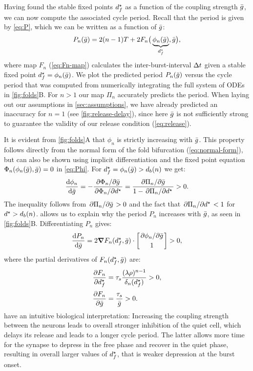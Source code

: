 \documentclass[../manuscript.tex]{subfiles}
\begin{document}
Having found the stable fixed points $d^\star_f$ as a function of the coupling strength $\bar g$, we can now compute the associated cycle period.
Recall that the period is given by \cref{eq:P}, which we can be written as a function of $\bar g$:
\begin{equation}
  \label{eq:period}
  P_n(\bar g) = 2(n-1)T + 2F_n\big(\underbrace{\phi_n(\bar g)}_{d^\star_f}, \bar g\big),
\end{equation}
where map $F_n$ (\cref{eq:Fn-map}) calculates the inter-burst-interval $\Delta t$ given a stable fixed point $d^\star_f=\phi_n(\bar g)$.
We plot the predicted period $P_n(\bar g)$ versus the cycle period that was computed from numerically integrating the full system of ODEs in \cref{fig:folds}B.
For $n>1$ our map $\Pi_n$ accurately predicts the period.
When laying out our assumptions in \cref{sec:assumptions}, we have already predicted an inaccuracy for $n=1$ (see \cref{fig:release-delay}), since here $\bar g$ is not sufficiently strong to guarantee the validity of our release condition (\cref{eq:release}).

It is evident from \cref{fig:folds}A that $\phi_n$ is strictly increasing with $\bar g$.
This property follows directly from the normal form of the fold bifurcation (\cref{eq:normal-form}), but can also be shown using implicit differentiation and the fixed point equation $\Phi_n(\phi_n(\bar g), \bar g)=0$ in \cref{eq:Phi}. For $d^\star_f=\phi_n(\bar g)>d_b(n)$ we get:
\begin{equation}
  \label{eq:dstardg}
  \dv{\phi_n}{\bar g} = -\frac{\pdv*{\Phi_n}{\bar g}}{\pdv*{\Phi_n}{d^\star}} =
  \frac{\pdv*{\Pi_n}{\bar g}}{1-\pdv*{\Pi_n}{d^\star}}>0.
\end{equation}
The inequality follows from $\pdv*{\Pi_n}{\bar g}>0$ and the fact that $\pdv*{\Pi_n}{d^\star}<1$ for $d^\star>d_b(n)$.
 allows us to explain why the period $P_n$ increases with $\bar g$, as seen in \cref{fig:folds}B.
Differentiating $P_n$ gives:
\begin{equation}
  \label{eq:dPdg}
  \dv{P_{n}}{\bar g} = 2\grad F_n(d^\star_f, \bar g) \cdot
  \begin{bmatrix}\pdv*{\phi_n}{\bar g}\\[0.5ex] 1\end{bmatrix}>0,
\end{equation}
where the partial derivatives of $F_n(d^\star_f, \bar g)$ are:
\begin{align}
  \pdv{F_n}{d^\star_f} & = \tau_s \frac{(\lambda\rho)^{n-1}}{\delta_n(d^\star_f)}>0, \\[0.5ex]
  \pdv{F_n}{\bar g}    & = \frac{\tau_s}{\bar g}>0.
\end{align}
 have an intuitive biological interpretation:
Increasing the coupling strength between the neurons leads to overall stronger inhibition of the quiet cell, which delays its release and leads to a longer cycle period.
The latter allows more time for the synapse to depress in the free phase and recover in the quiet phase, resulting in overall larger values of $d^\star_f$, that is weaker depression at the burst onset.
\end{document}
